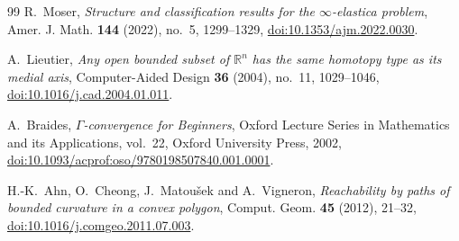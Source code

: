 \documentclass[11pt,reqno]{amsart}
\theoremstyle{definition}
\numberwithin{equation}{section}
\begin{document}
\begin{thebibliography}{99}
R.~Moser,
\emph{Structure and classification results for the $\infty$-elastica problem},
Amer. J. Math. \textbf{144} (2022), no.~5, 1299--1329, \href{https://doi.org/10.1353/ajm.2022.0030}{doi:10.1353/ajm.2022.0030}.

A.~Lieutier,
\emph{Any open bounded subset of $\mathbb{R}^n$ has the same homotopy type as its medial axis},
Computer-Aided Design \textbf{36} (2004), no.~11, 1029--1046, \href{https://doi.org/10.1016/j.cad.2004.01.011}{doi:10.1016/j.cad.2004.01.011}.

A.~Braides,
\emph{$\Gamma$-convergence for Beginners},
Oxford Lecture Series in Mathematics and its Applications, vol.~22, Oxford University Press, 2002, \href{https://doi.org/10.1093/acprof:oso/9780198507840.001.0001}{doi:10.1093/acprof:oso/9780198507840.001.0001}.

H.-K.~Ahn, O.~Cheong, J.~Matou\v{s}ek and A.~Vigneron,
\emph{Reachability by paths of bounded curvature in a convex polygon},
Comput. Geom. \textbf{45} (2012), 21--32, \href{https://doi.org/10.1016/j.comgeo.2011.07.003}{doi:10.1016/j.comgeo.2011.07.003}.

\end{thebibliography}
\end{document}
